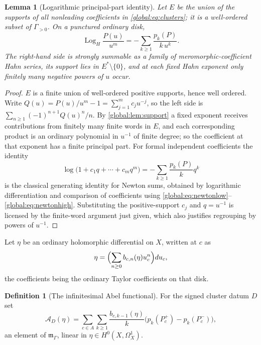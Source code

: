 \documentclass[11pt,letterpaper]{article}
\newtheorem{lemma}[lemma]{Lemma}
\theoremstyle{definition}
\newtheorem{definition}[definition]{Definition}
\theoremstyle{remark}
\newcommand{\mK}{\mathfrak m_\Gamma}
\newcommand{\LogH}{\operatorname{Log}_{H}}
\numberwithin{equation}{section}
\begin{document}
\begin{lemma}[Logarithmic principal-part identity]\label{global:lem:lognewton}
Let $E$ be the union of the supports of all nonleading coefficients in \eqref{global:eq:clusters}; it is a well-ordered subset of $\Gamma_{>0}$. On a punctured ordinary disk,
\begin{equation}\label{global:eq:lognewton}
  \LogH\frac{P(u)}{u^m}=-\sum_{k\ge1}\frac{p_k(P)}{k\,u^k}.
\end{equation}
The right-hand side is strongly summable as a family of meromorphic-coefficient Hahn series, its support lies in $E^*\setminus\{0\}$, and at each fixed Hahn exponent only finitely many negative powers of $u$ occur.
\end{lemma}

\begin{proof}
$E$ is a finite union of well-ordered positive supports, hence well ordered. Write $Q(u)=P(u)/u^m-1=\sum_{j=1}^mc_ju^{-j}$, so the left side is $\sum_{n\ge1}(-1)^{n+1}Q(u)^n/n$. By \cref{global:lem:support} a fixed exponent receives contributions from finitely many finite words in $E$, and each corresponding product is an ordinary polynomial in $u^{-1}$ of finite degree; so the coefficient at that exponent has a finite principal part. For formal independent coefficients the identity
\[
  \log\bigl(1+c_1q+\cdots+c_mq^m\bigr)=-\sum_{k\ge1}\frac{p_k(P)}{k}q^k
\]
is the classical generating identity for Newton sums, obtained by logarithmic differentiation and comparison of coefficients using \eqref{global:eq:newtonlow}--\eqref{global:eq:newtonhigh}. Substituting the positive-support $c_j$ and $q=u^{-1}$ is licensed by the finite-word argument just given, which also justifies regrouping by powers of $u^{-1}$.
\end{proof}

Let $\eta$ be an ordinary holomorphic differential on $X$, written at $c$ as
\begin{equation}\label{global:eq:differential}
  \eta=\Bigl(\sum_{n\ge0}b_{c,n}(\eta)u_c^n\Bigr)du_c,
\end{equation}
the coefficients being the ordinary Taylor coefficients on that disk.

\begin{definition}[The infinitesimal Abel functional]\label{global:def:abel}
For the signed cluster datum $D$ set
\begin{equation}\label{global:eq:Abel}
  \mathcal A_D(\eta)=\sum_{c\in A}\sum_{k\ge1}
  \frac{b_{c,k-1}(\eta)}{k}\bigl(p_k(P_c^+)-p_k(P_c^-)\bigr),
\end{equation}
an element of $\mK$, linear in $\eta\in H^0(X,\Omega^1_X)$.
\end{definition}
\end{document}
